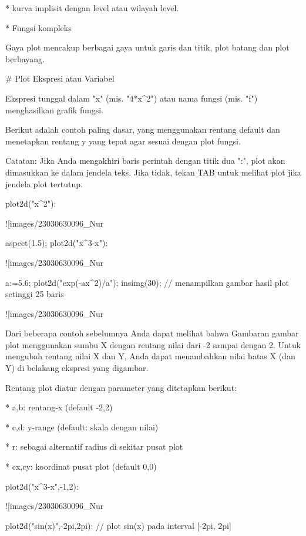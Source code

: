 \documentclass{article}
\begin{document}
* 
kurva implisit dengan level atau wilayah level.

* 
Fungsi kompleks


Gaya plot mencakup berbagai gaya untuk garis dan titik, plot batang
dan plot berbayang.


# Plot Ekspresi atau Variabel

Ekspresi tunggal dalam "x" (mis. "4*x^2") atau nama fungsi (mis. "f")
menghasilkan grafik fungsi.


Berikut adalah contoh paling dasar, yang menggunakan rentang default
dan menetapkan rentang y yang tepat agar sesuai dengan plot fungsi.


Catatan: Jika Anda mengakhiri baris perintah dengan titik dua ":",
plot akan dimasukkan ke dalam jendela teks. Jika tidak, tekan TAB
untuk melihat plot jika jendela plot tertutup.


\>plot2d("x^2"):


![images/23030630096_Nur%

\>aspect(1.5); plot2d("x^3-x"):


![images/23030630096_Nur%

\>a:=5.6; plot2d("exp(-a\*x^2)/a"); insimg(30); // menampilkan gambar hasil plot setinggi 25 baris


![images/23030630096_Nur%

Dari beberapa contoh sebelumnya Anda dapat melihat bahwa Gambaran
gambar plot menggunakan sumbu X dengan rentang nilai dari -2 sampai
dengan 2. Untuk mengubah rentang nilai X dan Y, Anda dapat menambahkan
nilai batas X (dan Y) di belakang ekspresi yang digambar.


Rentang plot diatur dengan parameter yang ditetapkan berikut:


* 
a,b: rentang-x (default -2,2)

* 
c,d: y-range (default: skala dengan nilai)

* 
r: sebagai alternatif radius di sekitar pusat plot

* 
cx,cy: koordinat pusat plot (default 0,0)


\>plot2d("x^3-x",-1,2):


![images/23030630096_Nur%

\>plot2d("sin(x)",-2\*pi,2\*pi): // plot sin(x) pada interval [-2pi, 2pi]
\end{document}
